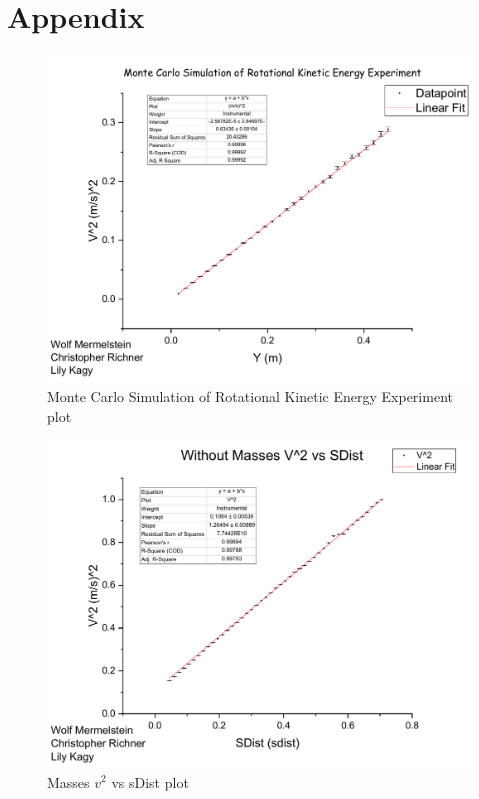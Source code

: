 \documentclass[coverpage]{article}
\begin{document}
	
	\nocite{textbook}
	\nocite{labManual}
	
	
	\onecolumn
	
	\section{Appendix} \label{sect:appendix}
		
	\begin{figure}[h]
		\label{fig:monte-carlo-simulation}
		\centering
		\caption{Monte Carlo Simulation of Rotational Kinetic Energy Experiment plot}
		\includegraphics[width=6in]{plots/monteCarloPlot.pdf}
	\end{figure}
		
	\begin{figure}[h]
		\label{fig:plot-without-masses}
		\centering
		\caption{Masses $v^2$ vs sDist plot}
		\includegraphics[width=6in]{plots/withMassesPlot.pdf}
	\end{figure}
		
\end{document}
